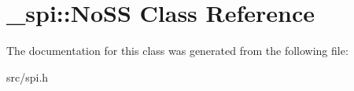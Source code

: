 \hypertarget{class__spi_1_1NoSS}{}\section{\+\_\+spi\+:\+:No\+SS Class Reference}
\label{class__spi_1_1NoSS}


The documentation for this class was generated from the following file\+:\begin{DoxyCompactItemize}
\item 
src/spi.\+h\end{DoxyCompactItemize}
